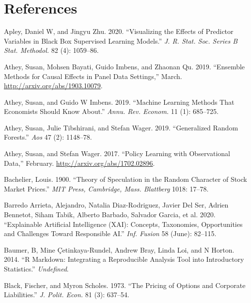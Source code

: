 \documentclass{article}
\begin{document}
\hypertarget{references}{%
\section*{References}\label{references}}

\hypertarget{refs}{}
\leavevmode\hypertarget{ref-Apley2020}{}%
Apley, Daniel W, and Jingyu Zhu. 2020. ``Visualizing the Effects of
Predictor Variables in Black Box Supervised Learning Models.'' \emph{J.
R. Stat. Soc. Series B Stat. Methodol.} 82 (4): 1059--86.

\leavevmode\hypertarget{ref-Athey2019b}{}%
Athey, Susan, Mohsen Bayati, Guido Imbens, and Zhaonan Qu. 2019.
``Ensemble Methods for Causal Effects in Panel Data Settings,'' March.
\url{http://arxiv.org/abs/1903.10079}.

\leavevmode\hypertarget{ref-Athey2019a}{}%
Athey, Susan, and Guido W Imbens. 2019. ``Machine Learning Methods That
Economists Should Know About.'' \emph{Annu. Rev. Econom.} 11 (1):
685--725.

\leavevmode\hypertarget{ref-Athey2019c}{}%
Athey, Susan, Julie Tibshirani, and Stefan Wager. 2019. ``Generalized
Random Forests.'' \emph{Aos} 47 (2): 1148--78.

\leavevmode\hypertarget{ref-Athey2017}{}%
Athey, Susan, and Stefan Wager. 2017. ``Policy Learning with
Observational Data,'' February. \url{http://arxiv.org/abs/1702.02896}.

\leavevmode\hypertarget{ref-Bachelier1900}{}%
Bachelier, Louis. 1900. ``Theory of Speculation in the Random Character
of Stock Market Prices.'' \emph{MIT Press, Cambridge, Mass. Blattberg}
1018: 17--78.

\leavevmode\hypertarget{ref-Barredo_Arrieta2020}{}%
Barredo Arrieta, Alejandro, Natalia Diaz-Rodriguez, Javier Del Ser,
Adrien Bennetot, Siham Tabik, Alberto Barbado, Salvador Garcia, et al.
2020. ``Explainable Artificial Intelligence (XAI): Concepts, Taxonomies,
Opportunities and Challenges Toward Responsible AI.'' \emph{Inf. Fusion}
58 (June): 82--115.

\leavevmode\hypertarget{ref-Baumer2014}{}%
Baumer, B, Mine Çetinkaya-Rundel, Andrew Bray, Linda Loi, and N Horton.
2014. ``R Markdown: Integrating a Reproducible Analysis Tool into
Introductory Statistics.'' \emph{Undefined}.

\leavevmode\hypertarget{ref-Black1973}{}%
Black, Fischer, and Myron Scholes. 1973. ``The Pricing of Options and
Corporate Liabilities.'' \emph{J. Polit. Econ.} 81 (3): 637--54.
\end{document}
